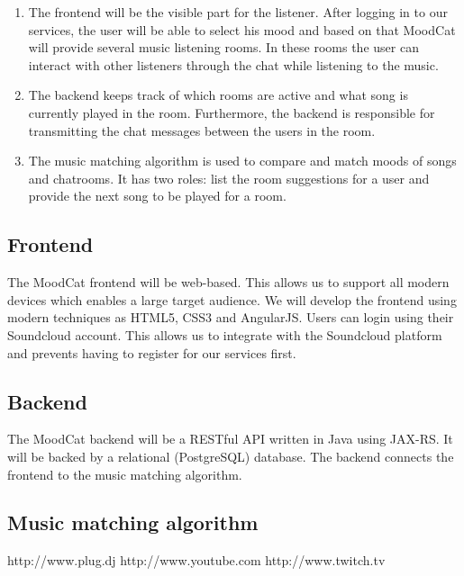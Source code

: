 \documentclass[10pt,a4paper]{article}
\begin{document}
\begin{enumerate}
\item The frontend will be the visible part for the listener.
After logging in to our services, the user will be able to select his mood and based on that MoodCat will provide several music listening rooms.
In these rooms the user can interact with other listeners through the chat while listening to the music.

\item The backend keeps track of which rooms are active and what song is currently played in the room.
Furthermore, the backend is responsible for transmitting the chat messages between the users in the room.

\item The music matching algorithm is used to compare and match moods of songs and chatrooms.
It has two roles: list the room suggestions for a user and provide the next song to be played for a room.
\end{enumerate}

\newpage

\subsection{Frontend}

The MoodCat frontend will be web-based. This allows us to support all modern devices which enables a large target audience. We will develop the frontend using modern techniques as HTML5, CSS3 and AngularJS. Users can login using their Soundcloud account. This allows us to integrate with the Soundcloud platform and prevents having to register for our services first.

\subsection{Backend}

The MoodCat backend will be a RESTful API written in Java using JAX-RS. It will be backed by a relational (PostgreSQL) database. The backend connects the frontend to the music matching algorithm.

\subsection{Music matching algorithm}



\begin{thebibliography}{10}
 http://www.plug.dj
 http://www.youtube.com
 http://www.twitch.tv
\end{thebibliography}
\end{document}
